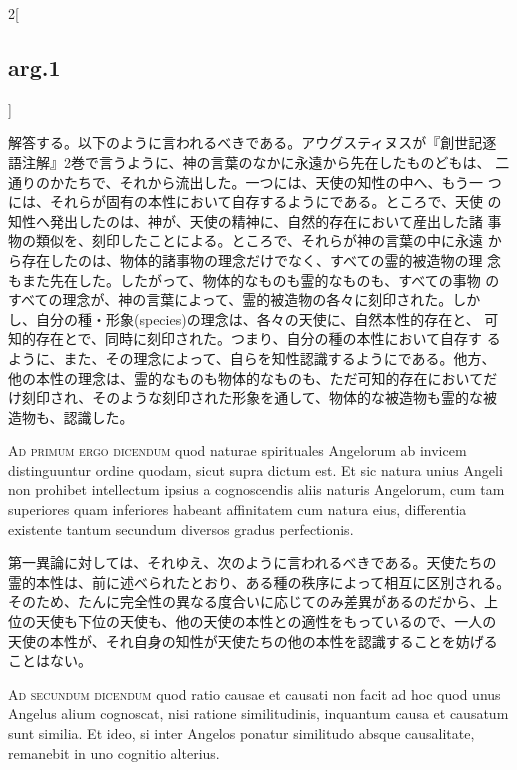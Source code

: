 \documentclass[paper=a4paper,fontsize=10pt,jafontsize=9pt,titlepage]{jlreq}
\begin{document}
\begin{paracol}{2}[\subsection{arg.1}]
\switchcolumn

解答する。以下のように言われるべきである。アウグスティヌスが『創世記逐
語注解』2巻で言うように、神の言葉のなかに永遠から先在したものどもは、
二通りのかたちで、それから流出した。一つには、天使の知性の中へ、もう一
つには、それらが固有の本性において自存するようにである。ところで、天使
の知性へ発出したのは、神が、天使の精神に、自然的存在において産出した諸
事物の類似を、刻印したことによる。ところで、それらが神の言葉の中に永遠
から存在したのは、物体的諸事物の理念だけでなく、すべての霊的被造物の理
念もまた先在した。したがって、物体的なものも霊的なものも、すべての事物
のすべての理念が、神の言葉によって、霊的被造物の各々に刻印された。しか
し、自分の種・形象(species)の理念は、各々の天使に、自然本性的存在と、
可知的存在とで、同時に刻印された。つまり、自分の種の本性において自存す
るように、また、その理念によって、自らを知性認識するようにである。他方、
他の本性の理念は、霊的なものも物体的なものも、ただ可知的存在においてだ
け刻印され、そのような刻印された形象を通して、物体的な被造物も霊的な被
造物も、認識した。

\switchcolumn*[\subsection{ad.1}]

{\scshape Ad primum ergo dicendum} quod naturae spirituales Angelorum
ab invicem distinguuntur ordine quodam, sicut supra dictum est. Et sic
natura unius Angeli non prohibet intellectum ipsius a cognoscendis
aliis naturis Angelorum, cum tam superiores quam inferiores habeant
affinitatem cum natura eius, differentia existente tantum secundum
diversos gradus perfectionis.

\switchcolumn

第一異論に対しては、それゆえ、次のように言われるべきである。天使たちの
霊的本性は、前に述べられたとおり、ある種の秩序によって相互に区別される。
そのため、たんに完全性の異なる度合いに応じてのみ差異があるのだから、上
位の天使も下位の天使も、他の天使の本性との適性をもっているので、一人の
天使の本性が、それ自身の知性が天使たちの他の本性を認識することを妨げる
ことはない。

\switchcolumn*[\subsection{ad.2}]

{\scshape Ad secundum dicendum} quod ratio causae et causati non facit
ad hoc quod unus Angelus alium cognoscat, nisi ratione similitudinis,
inquantum causa et causatum sunt similia. Et ideo, si inter Angelos
ponatur similitudo absque causalitate, remanebit in uno cognitio
alterius.


\end{paracol}
\end{document}
